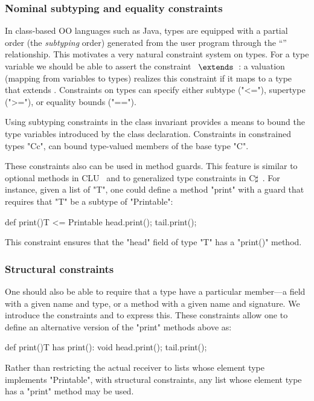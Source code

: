 \subsubsection{Nominal subtyping and equality constraints}

In class-based OO languages such as Java,
types are equipped with a partial
order (the \emph{subtyping} order) generated from the user program
through the ``'' relationship.  
This motivates a very natural constraint system on types.  For a type
variable  we should be able to assert the constraint
~$\extends$~: a valuation (mapping from variables to types) realizes
this constraint if it maps  to a type that extends .
Constraints on types can specify either subtype (\xcd"<="),
supertype (\xcd">="), or equality bounds (\xcd"==").

Using subtyping constraints in the class invariant provides a
means to bound the type variables introduced by the class
declaration.  Constraints in constrained types
\xcd"C{c}", can bound
type-valued members of the base type \xcd"C".

These constraints also can be used in method guards.
This feature is similar to optional methods in CLU~\cite{clu} and to generalized type constraints in C$\sharp$~\cite{emir06}.
For instance, given a list of \xcd"T", one could define a
method \xcd"print" with a guard that requires that \xcd"T" be a
subtype of \xcd"Printable":
\begin{xtenmathnoindent}
  def print(){T <= Printable} {
    head.print();
    tail.print();
  }
\end{xtenmathnoindent}
This constraint ensures that the \xcd"head" field of type
\xcd"T" has a \xcd"print()" method.

\subsubsection{Structural constraints}

One should also
be able to require that a type have a
particular member---a field with a given name and type, or a method
with a given name and signature.
We introduce the constraints 
   and  
 to express this.
These
constraints allow one to define an alternative version of the
\xcd"print" methods above  as:
\begin{xtenmathnoindent}
  def print(){T has print(): void} {
    head.print();
    tail.print();
  }
\end{xtenmathnoindent}
Rather than restricting the actual receiver to lists whose
element type implements \xcd"Printable", with structural
constraints, any list whose element type has a \xcd"print"
method may be used.

